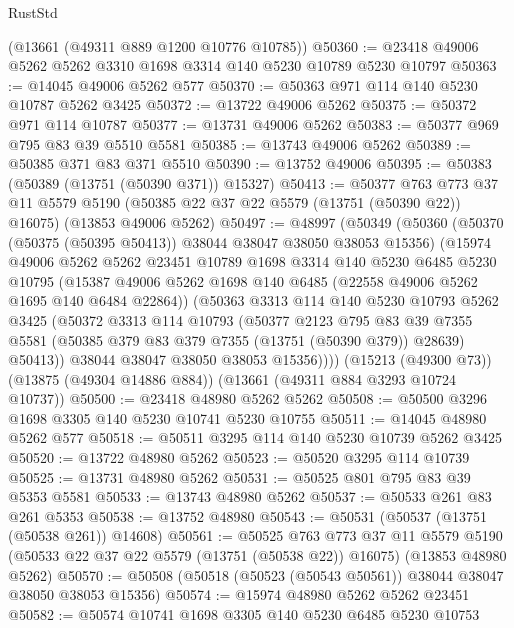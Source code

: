 \begin{lexlean}{RustStd}
\begin{coremodule}
    (@13661 (@49311 @889 @1200 @10776 @10785))
@50360 := @23418 @49006 @5262 @5262 @3310 @1698 @3314 @140 @5230 @10789 @5230 @10797
@50363 := @14045 @49006 @5262 @577
@50370 := @50363 @971 @114 @140 @5230 @10787 @5262 @3425
@50372 := @13722 @49006 @5262
@50375 := @50372 @971 @114 @10787
@50377 := @13731 @49006 @5262
@50383 := @50377 @969 @795 @83 @39 @5510 @5581
@50385 := @13743 @49006 @5262
@50389 := @50385 @371 @83 @371 @5510
@50390 := @13752 @49006
@50395 := @50383 (@50389 (@13751 (@50390 @371)) @15327)
@50413 := @50377
    @763
    @773
    @37
    @11
    @5579
    @5190
    (@50385 @22 @37 @22 @5579 (@13751 (@50390 @22)) @16075)
    (@13853 @49006 @5262)
@50497 := @48997
    (@50349
      (@50360
        (@50370 (@50375 (@50395 @50413)) @38044 @38047 @38050 @38053 @15356)
        (@15974
          @49006
          @5262
          @5262
          @23451
          @10789
          @1698
          @3314
          @140
          @5230
          @6485
          @5230
          @10795
          (@15387 @49006 @5262 @1698 @140 @6485 (@22558 @49006 @5262 @1695 @140 @6484 @22864))
          (@50363
            @3313
            @114
            @140
            @5230
            @10793
            @5262
            @3425
            (@50372
              @3313
              @114
              @10793
              (@50377
                @2123
                @795
                @83
                @39
                @7355
                @5581
                (@50385 @379 @83 @379 @7355 (@13751 (@50390 @379)) @28639)
                @50413))
            @38044
            @38047
            @38050
            @38053
            @15356))))
    (@15213 (@49300 @73))
    (@13875 (@49304 @14886 @884))
    (@13661 (@49311 @884 @3293 @10724 @10737))
@50500 := @23418 @48980 @5262 @5262
@50508 := @50500 @3296 @1698 @3305 @140 @5230 @10741 @5230 @10755
@50511 := @14045 @48980 @5262 @577
@50518 := @50511 @3295 @114 @140 @5230 @10739 @5262 @3425
@50520 := @13722 @48980 @5262
@50523 := @50520 @3295 @114 @10739
@50525 := @13731 @48980 @5262
@50531 := @50525 @801 @795 @83 @39 @5353 @5581
@50533 := @13743 @48980 @5262
@50537 := @50533 @261 @83 @261 @5353
@50538 := @13752 @48980
@50543 := @50531 (@50537 (@13751 (@50538 @261)) @14608)
@50561 := @50525
    @763
    @773
    @37
    @11
    @5579
    @5190
    (@50533 @22 @37 @22 @5579 (@13751 (@50538 @22)) @16075)
    (@13853 @48980 @5262)
@50570 := @50508 (@50518 (@50523 (@50543 @50561)) @38044 @38047 @38050 @38053 @15356)
@50574 := @15974 @48980 @5262 @5262 @23451
@50582 := @50574 @10741 @1698 @3305 @140 @5230 @6485 @5230 @10753

\end{coremodule}
\end{lexlean}
